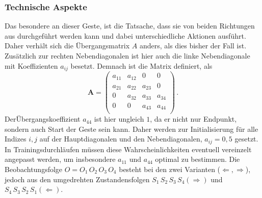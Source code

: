 \subsubsection{Technische Aspekte}
Das besondere an dieser Geste, ist die Tatsache, dass sie von beiden Richtungen aus durchgef\"uhrt werden kann und dabei unterschiedliche Aktionen ausf\"uhrt.
\newline
Daher verh\"alt sich die \"Ubergangsmatrix $A$ anders, als dies bisher der Fall ist. Zus\"atzlich zur rechten Nebendiagonalen ist hier auch die linke Nebendiagonale mit Koeffizienten $a_{ij}$ besetzt. Demnach ist die Matrix definiert, als
\begin{equation}
\mathbf{A} = 
\begin{pmatrix}
a_{11} & a_{12} & 0 & 0\\
 a_{21} & a_{22} & a_{23} & 0\\
0 &  a_{32} & a_{33} & a_{34}\\
0 & 0 & a_{43} & a_{44} \\
\end{pmatrix} \, .
\end{equation}
Der\"Ubergangskoeffizient $a_{44}$ ist hier ungleich $1$, da er nicht nur Endpunkt, sondern auch Start der Geste sein kann. Daher werden zur Initialisierung f\"ur alle Indizes $i, j$ auf der Hauptdiagonalen und den Nebendiagonalen, $a_{ij} = 0,5$ gesetzt. In Trainingsdurchl\"aufen m\"ussen diese Wahrscheinlichkeiten eventuell vereinzelt angepasst werden, um insbesondere $a_{11}$ und $a_{44}$ optimal zu bestimmen. Die Beobachtungsfolge $O = O_1\, O_2\, O_3\, O_4$ besteht bei den zwei Varianten ($\Leftarrow, \Rightarrow$), jedoch aus den umgedrehten Zustandensfolgen $S_1\, S_2\, S_3\, S_4 (\Rightarrow)$ und $S_4\, S_3\, S_2\, S_1 (\Leftarrow)$.
